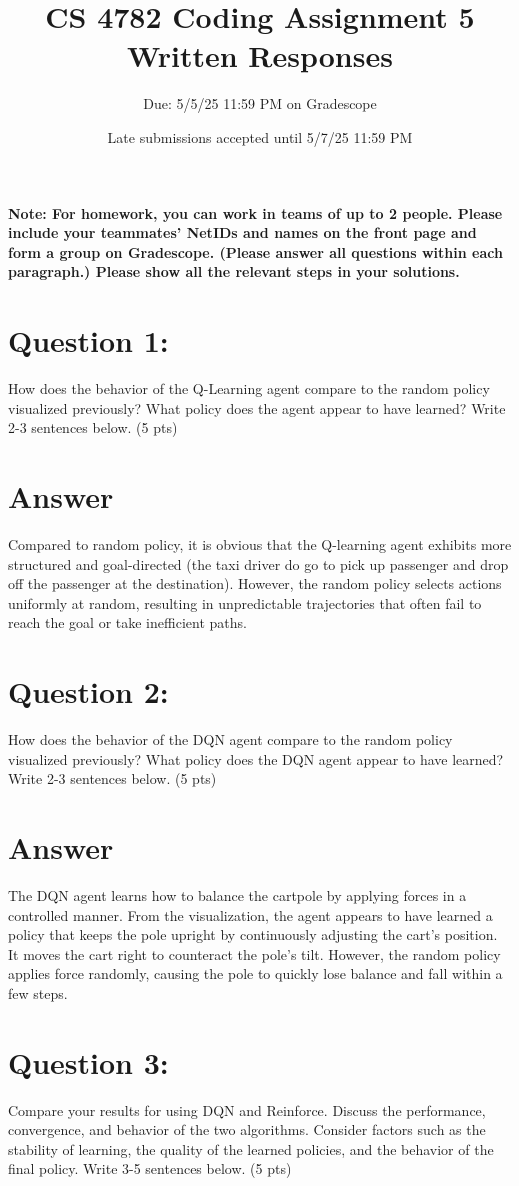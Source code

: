 \documentclass{article}
\title{CS 4782 Coding Assignment 5 Written Responses\vspace{-10pt}}
\author{Due: 5/5/25 11:59 PM on Gradescope}
\date{Late submissions accepted until 5/7/25 11:59 PM}
\begin{document}
    \maketitle
    \textbf{Note: For homework, you can work in teams of up to 2 people. Please include your teammates’ NetIDs and names on the front page and form a group on Gradescope. (Please answer all questions within each paragraph.) Please show all the relevant steps in your solutions. }
\maketitle
\section*{Question 1:}
How does the behavior of the Q-Learning agent compare to the random policy visualized previously? What policy does the agent appear to have learned? Write 2-3 sentences below. (5 pts)
\section*{Answer}
Compared to random policy, it is obvious that the Q-learning agent exhibits more structured and goal-directed (the taxi driver do go to pick up passenger and drop off the passenger at the destination). However, the random policy selects actions uniformly at random, resulting in unpredictable trajectories that often fail to reach the goal or take inefficient paths.

\section*{Question 2:}
How does the behavior of the DQN agent compare to the random policy visualized previously? What policy does the DQN agent appear to have learned? Write 2-3 sentences below. (5 pts)
\section*{Answer}
The DQN agent learns how to balance the cartpole by applying forces in a controlled manner. From the visualization, the agent appears to have learned a policy that keeps the pole upright by continuously adjusting the cart's position. It moves the cart right to counteract the pole's tilt. However, the random policy applies force randomly, causing the pole to quickly lose balance and fall within a few steps.


\section*{Question 3:}
Compare your results for using DQN and Reinforce. Discuss the performance, convergence, and behavior of the two algorithms. Consider factors such as the stability of learning, the quality of the learned policies, and the behavior of the final policy. Write 3-5 sentences below. (5 pts)
\end{document}
